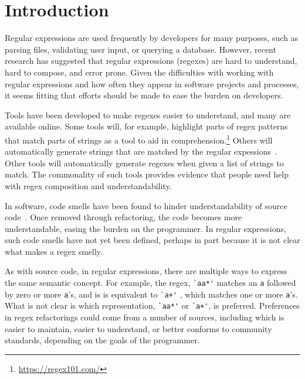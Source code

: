 \section{Introduction }

Regular expressions are used frequently by developers for many purposes, such as parsing files, validating user input, or querying a database.
However, recent research has suggested that regular expressions (regexes) are hard to understand, hard to compose, and error prone.
Given the difficulties with working with regular expressions and how often they appear in software projects and processes, it seems fitting that efforts should be made to ease the burden on developers.

Tools have been developed to make regexes easier to understand, and many are available online.
Some tools will, for example, highlight parts of regex patterns that match parts of strings as a tool to aid in comprehension.\footnote{\url{https://regex101.com/}}
Others will automatically generate strings that are matched by the regular expessions~\cite{}.
Other tools will automatically generate regexes when given a list of strings to match.
The commonality of such tools provides evidence that people need help with regex composition and understandability.

In software, code smells have been found to hinder understandability of source code~\cite{}.
Once removed through refactoring, the code becomes more understandable, easing the burden on the programmer.
In regular expressions, such code smells have not yet been defined, perhaps in part because it is not clear what makes a regex smelly.

As with source code, in regular expressions, there are multiple ways to express the same semantic concept.
For example, the regex, \verb!`aa*'! matches an \verb!a! followed by zero or more \verb!a!'s, and is is equivalent to \verb!`a+'! , which matches one or more \verb!a!'s.
What is not clear is which representation,  \verb!`aa*'!  or  \verb!`a+'!, is preferred.
Preferences in regex refactorings could come from a number of sources, including which is easier to maintain, easier to understand, or better conforms to community standards, depending on the goals of the programmer.

